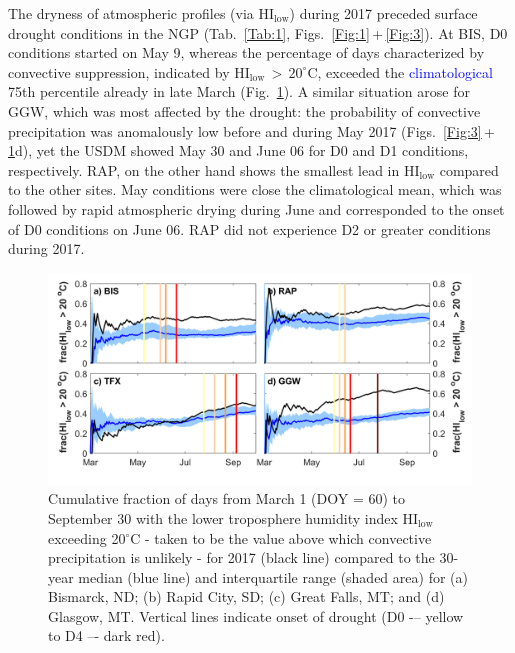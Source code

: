 \documentclass[hess, manuscript]{copernicus}
\def\TG{\textcolor{blue}}
\begin{document}
The dryness of atmospheric profiles (via $\mathrm{HI_{low}}$) during 2017 preceded surface drought conditions in the NGP (Tab.~\ref{Tab:1}, Figs.~\ref{Fig:1}\,+\,\ref{Fig:3}). At BIS, D0 conditions started on May 9, whereas the percentage of days characterized by convective suppression, indicated by $\mathrm{HI_{low}\,>\,20^\circ}$C, exceeded the \TG{climatological} 75th percentile already in late March (Fig.~\ref{Fig:4}). A similar situation arose for GGW, which was most affected by the drought: the probability of convective precipitation was anomalously low before and during May 2017 (Figs.~\ref{Fig:3}\,+\,\ref{Fig:4}d), yet the USDM showed May 30 and June 06 for D0 and D1 conditions, respectively. RAP, on the other hand shows the smallest lead in $\mathrm{HI_{low}}$ compared to the other sites. May conditions were close the climatological mean, which was followed by rapid atmospheric drying during June and corresponded to the onset of D0 conditions on June 06. RAP did not experience D2 or greater conditions during 2017.
%
\begin{figure}[t]
\includegraphics[width=12cm]{./Figures/HIlowC_IQR_rev.png}
\caption{Cumulative fraction of days from March 1 (DOY = 60) to September 30 with the lower troposphere humidity index $\mathrm{HI_{low}}$ exceeding 20$\mathrm{^\circ}$C - taken to be the value above which convective precipitation is unlikely - for 2017 (black line) compared to the 30-year median (blue line) and interquartile range (shaded area) for (a) Bismarck, ND; (b) Rapid City, SD; (c) Great Falls, MT; and (d) Glasgow, MT. Vertical lines indicate onset of drought (D0 -– yellow to D4 –- dark red). }\label{Fig:4}
\end{figure}
\end{document}
